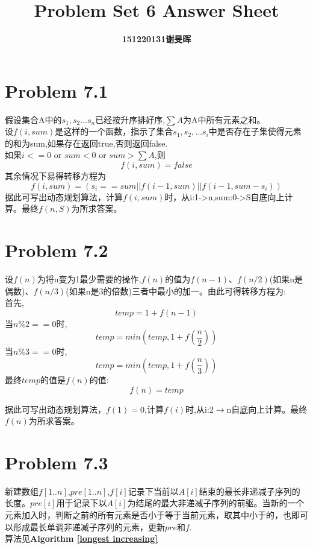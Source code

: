 \documentclass[onecolumn]{ctexart}
\begin{document}
	\title{Problem Set 6 Answer Sheet}
	\author{\textbf{151220131谢旻晖}}
	\date{}
	\maketitle



\section*{Problem 7.1}
\indent 假设集合A中的$s_1,s_2...s_n$已经按升序排好序,$\sum A$为A中所有元素之和。\\
\indent 设$f(i,sum)$是这样的一个函数，指示了集合{$s_1,s_2,...s_i$}中是否存在子集使得元素的和为sum,如果存在返回true,否则返回false.\\

%
\indent 如果$i<=0$ or $sum<0$ or $sum>\sum A$,则
\[f(i,sum)=false\]
\indent 其余情况下易得转移方程为
\[f(i,sum)=\left(s_i==sum||f(i-1,sum)||f(i-1,sum-s_i)\right)\]
\indent 据此可写出动态规划算法，计算$f(i,sum)$时，从i:1->n,sum:0->S自底向上计算。最终$f(n,S)$为所求答案。\\

\section*{Problem 7.2}
\indent 设$f(n)$为将n变为1最少需要的操作,$f(n)$的值为$f(n-1)$、$f(n/2)$(如果n是偶数)、$f(n/3)$(如果n是3的倍数)三者中最小的加一。由此可得转移方程为:\\
首先,
 \[temp=1+f(n-1)\]
当$n\%2==0$时,
		\[temp=min(temp,1+f(\frac{n}{2}))\]
当$n\%3==0$时,
\[temp=min(temp,1+f(\frac{n}{3}))\]
最终$temp$的值是$f(n)$的值:
\[f(n)=temp\]

\indent 据此可写出动态规划算法，$f(1)=0$,计算$f(i)$时,从i:2$\rightarrow$n自底向上计算。最终$f(n)$为所求答案。\\

\section*{Problem 7.3}
\indent 新建数组$f[1..n]$,$pre[1..n]$,$f[i]$记录下当前以$A[i]$结束的最长非递减子序列的长度。$pre[i]$用于记录下以$A[i]$为结尾的最大非递减子序列的前驱。当新的一个元素加入时，判断之前的所有元素是否小于等于当前元素，取其中小于的，也即可以形成最长单调非递减子序列的元素，更新$pre$和$f$.\\
\indent 算法见\textbf{Algorithm \ref{longest increasing}}
\end{document}
